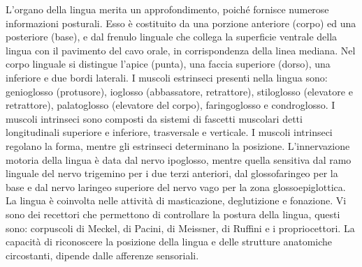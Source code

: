 L’organo della lingua merita un approfondimento, poiché fornisce numerose informazioni posturali. Esso è costituito da una porzione anteriore (corpo) ed una posteriore (base), e dal frenulo linguale che collega la superficie ventrale della lingua con il pavimento del cavo orale, in corrispondenza della linea mediana. Nel corpo linguale si distingue l’apice (punta), una faccia superiore (dorso), una inferiore e due bordi laterali. I muscoli estrinseci presenti nella lingua sono: genioglosso (protusore), ioglosso (abbassatore, retrattore), stiloglosso (elevatore e retrattore), palatoglosso (elevatore del corpo), faringoglosso e condroglosso. I muscoli intrinseci sono composti da sistemi di fascetti muscolari detti longitudinali superiore e inferiore, trasversale e verticale. I muscoli intrinseci regolano la forma, mentre gli estrinseci determinano la posizione. L’innervazione motoria della lingua è data dal nervo ipoglosso, mentre quella sensitiva dal ramo linguale del nervo trigemino per i due terzi anteriori, dal glossofaringeo per la base e dal nervo laringeo superiore del nervo vago per la zona glossoepiglottica. La lingua è coinvolta nelle attività di masticazione, deglutizione e fonazione. Vi sono dei recettori che permettono di controllare la postura della lingua, questi sono: corpuscoli di Meckel, di Pacini, di Meissner, di Ruffini e i propriocettori. La capacità di riconoscere la posizione della lingua e delle strutture anatomiche circostanti, dipende dalle afferenze sensoriali.

